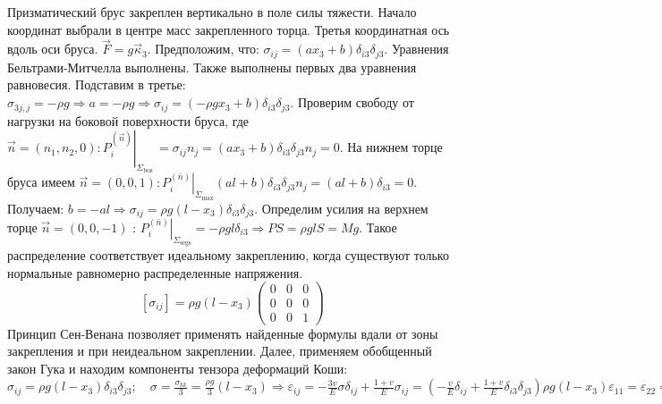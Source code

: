 Призматический брус закреплен вертикально в поле силы тяжести. Начало координат выбрали в центре масс закрепленного торца. Третья координатная ось вдоль оси бруса. $\vec{F}=g \vec{\kappa}_3$. Предположим, что: $\sigma_{i j}=\left(a x_3+b\right) \delta_{i 3} \delta_{j 3}$. Уравнения Бельтрами-Митчелла выполнены. Также выполнены первых два уравнения равновесия. Подставим в третье: $\sigma_{3 j, j}=-\rho g \Rightarrow a=-\rho g \Rightarrow \sigma_{i j}=\left(-\rho g x_3+b\right) \delta_{i 3} \delta_{j 3}$. Проверим свободу от нагрузки на боковой поверхности бруса, где $\vec{n}=\left(n_1, n_2, 0\right):\left.P_i^{(\vec{n})}\right|_{\Sigma_{\text {bos }}}=\sigma_{i j} n_j=\left(a x_3+b\right) \delta_{i 3} \delta_{j 3} n_j=0$. На нижнем торце бруса имеем $\vec{n}=(0,0,1):\left.P_i^{(\bar{n})}\right|_{\Sigma_{\max }}(a l+b) \delta_{i 3} \delta_{j 3} n_j=(a l+b) \delta_{i 3}=0$.
Получаем: $b=-a l \Rightarrow \sigma_{i j}=\rho g\left(l-x_3\right) \delta_{i 3} \delta_{j 3}$. Определим усилия на верхнем торце $\vec{n}=(0,0,-1)$ : $\left.P_i^{(\bar{n})}\right|_{\Sigma_{\mathrm{segs}}}=-\rho g l \delta_{i 3} \Rightarrow P S=\rho g l S=M g$. Такое распределение соответствует идеальному закреплению, когда существуют только нормальные равномерно распределенные напряжения.
$$
\left[\sigma_{i j}\right]=\rho g\left(l-x_3\right)\left(\begin{array}{lll}
0 & 0 & 0 \\
0 & 0 & 0 \\
0 & 0 & 1
\end{array}\right)
$$
Принцип Сен-Венана позволяет применять найденные формулы вдали от зоны закрепления и при неидеальном закреплении. Далее, применяем обобщенный закон Гука и находим компоненты тензора деформаций Коши:
$ \sigma_{i j}= \rho g\left(l-x_3\right) \delta_{i 3} \delta_{j 3} ;\quad \sigma=\frac{\sigma_{k k}}{3}=\frac{\rho g}{3}\left(l-x_3\right) \Rightarrow \varepsilon_{i j}=-\frac{3 v}{E} \sigma \delta_{i j}+\frac{1+v}{E} \sigma_{i j}=\left(-\frac{v}{E} \delta_{i j}+\frac{1+v}{E} \delta_{i 3} \delta_{j 3}\right) \rho g\left(l-x_3\right) \varepsilon_{11}= \varepsilon_{22}=-\frac{v}{E} \rho g\left(l-x_3\right) ; \varepsilon_{33}=\frac{\rho g}{E}\left(l-x_3\right) ; \varepsilon_{12}=\varepsilon_{13}=\varepsilon_{23}=0.$


